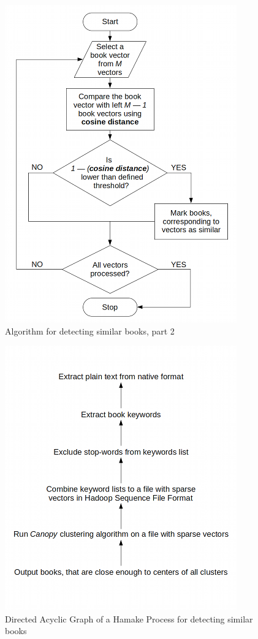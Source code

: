 \documentclass{article}
\begin{document}
\begin{figure}[htp]
\centering
\includegraphics[width=10cm]{SimilarityAlgPart2.png}
\caption{Algorithm for detecting similar books, part 2}
\label{fig:SimilarityAlg2}
\end{figure}

\begin{figure}[htp]
\centering
\includegraphics[width=10cm]{SimilarityAlgDAG.png}
\caption{Directed Acyclic Graph of a Hamake Process for detecting similar books}
\label{fig:SimilarityAlgDAG}
\end{figure}
\end{document}

